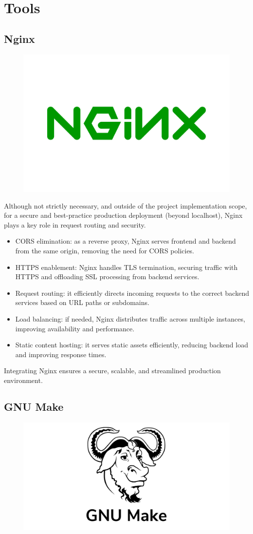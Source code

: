 \section{Tools}

\subsection{Nginx}

\begin{figure}[H]
    \hfill
    \includegraphics[width=0.1\linewidth]{../assets/tools-logos/nginx.png}
    \hspace{1cm}
\end{figure}

Although not strictly necessary, and outside of the project implementation scope, for a secure and best-practice production deployment (beyond localhost), Nginx plays a key role in request routing and security.

\begin{itemize}

    \item CORS elimination: as a reverse proxy, Nginx serves frontend and backend from the same origin, removing the need for CORS policies.
    \item HTTPS enablement: Nginx handles TLS termination, securing traffic with HTTPS and offloading SSL processing from backend services.
    \item Request routing: it efficiently directs incoming requests to the correct backend services based on URL paths or subdomains.
    \item Load balancing: if needed, Nginx distributes traffic across multiple instances, improving availability and performance.
    \item Static content hosting: it serves static assets efficiently, reducing backend load and improving response times.

\end{itemize}

Integrating Nginx ensures a secure, scalable, and streamlined production environment.

\subsection{GNU Make}

\begin{figure}[H]
    \hfill
    \includegraphics[width=0.1\linewidth]{../assets/tools-logos/make.png}
    \hspace{1cm}
\end{figure}

